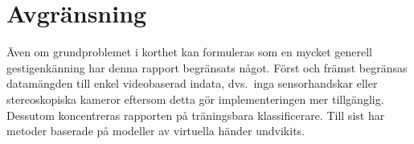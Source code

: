 \documentclass[../rapport_MVEX01-11-05]{subfiles}
\begin{document}
\section{Avgränsning}

Även om grundproblemet i korthet kan formuleras som en mycket generell
gestigenkänning har denna rapport begränsats något. Först och främst
begränsas datamängden till enkel videobaserad indata, dvs.~inga sensorhandskar
eller stereoskopiska kameror eftersom detta gör implementeringen mer
tillgänglig. Dessutom koncentreras rapporten på träningsbara
klassificerare. Till sist har metoder baserade på modeller av virtuella händer
undvikits.

\end{document}
